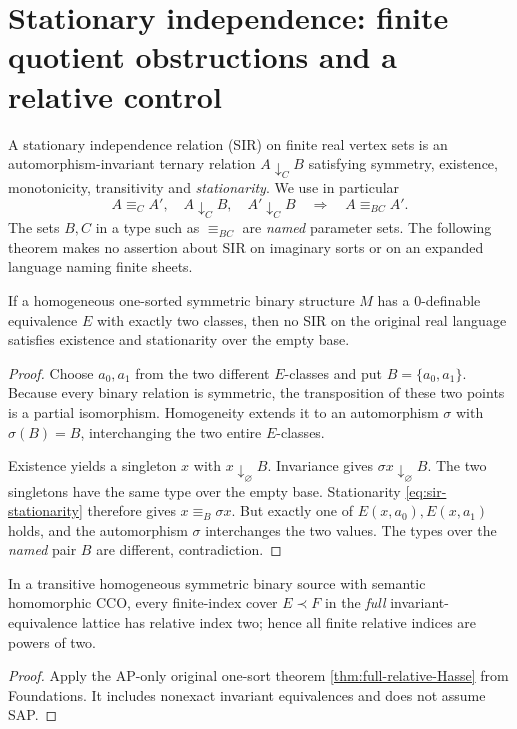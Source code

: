 \section{Stationary independence: finite quotient obstructions and a relative control}
\label{sec:sir-scope}

A stationary independence relation (SIR) on finite real
vertex sets is an automorphism-invariant ternary
relation \(A\downarrow_C B\) satisfying symmetry,
existence, monotonicity, transitivity and
\emph{stationarity}. We use in particular
\[
 A\equiv_C A',\quad A\downarrow_C B,\quad
 A'\downarrow_C B\quad\Longrightarrow\quad
 A\equiv_{BC}A'.
 \tag{SIR}\label{eq:sir-stationarity}
\]
The sets \(B,C\) in a type such as
\(\equiv_{BC}\) are \emph{named} parameter sets.
The following theorem makes no assertion about
SIR on imaginary sorts or on an expanded
language naming finite sheets.

\begin{lemma}
\label{lem:sir-global-two}
If a homogeneous one-sorted symmetric binary
structure \(M\) has a \(0\)-definable
equivalence \(E\) with exactly two classes,
then no SIR on the original real language
satisfies existence and stationarity
over the empty base.
\end{lemma}
\begin{proof}
Choose \(a_0,a_1\) from the two different
\(E\)-classes and put \(B=\{a_0,a_1\}\).
Because every binary relation is symmetric,
the transposition of these two points is a
partial isomorphism. Homogeneity extends it
to an automorphism \(\sigma\) with
\(\sigma(B)=B\), interchanging the two
entire \(E\)-classes.

Existence yields a singleton \(x\) with
\(x\downarrow_\varnothing B\).
Invariance gives
\(\sigma x\downarrow_\varnothing B\).
The two singletons have the same type
over the empty base. Stationarity
\eqref{eq:sir-stationarity} therefore
gives \(x\equiv_B\sigma x\).
But exactly one of \(E(x,a_0),E(x,a_1)\)
holds, and the automorphism \(\sigma\)
interchanges the two values. The types
over the \emph{named} pair \(B\)
are different, contradiction.
\end{proof}

\begin{lemma}
\label{lem:sir-Hasse-two}
In a transitive homogeneous symmetric binary source with
semantic homomorphic CCO, every finite-index cover
$E\prec F$ in the \emph{full} invariant-equivalence lattice
has relative index two; hence all finite relative indices
are powers of two.
\end{lemma}
\begin{proof}
Apply the AP-only original one-sort theorem
\cref{thm:full-relative-Hasse} from Foundations.
It includes nonexact invariant equivalences and does not
assume SAP.
\end{proof}

